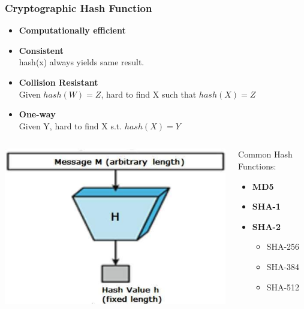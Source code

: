 \begin{frame}
    \frametitle{Cryptographic Hash Function}
    \begin{itemize}
        \item \textbf{Computationally efficient}
        \item \textbf{Consistent} \\
            hash(x) always yields same result.
        \item \textbf{Collision Resistant} \\
            Given $hash(W) = Z$, hard to find X such that $hash(X) = Z$
        \item \textbf{One-way} \\
            Given Y, hard to find X s.t. $hash(X) = Y$
    \end{itemize}
    \begin{columns}
        \begin{column}{0.5\textwidth}
            \includegraphics[scale=0.3]{./figures/hash_functions.jpg}
        \end{column}
        \begin{column}{0.5\textwidth}
            Common Hash Functions:
            \begin{itemize}
                \item \textbf{MD5}
                \item \textbf{SHA-1}
                \item \textbf{SHA-2}
                    \begin{itemize}
                        \item SHA-256
                        \item SHA-384
                        \item SHA-512
                    \end{itemize}
            \end{itemize}
        \end{column}
    \end{columns}
\end{frame}

